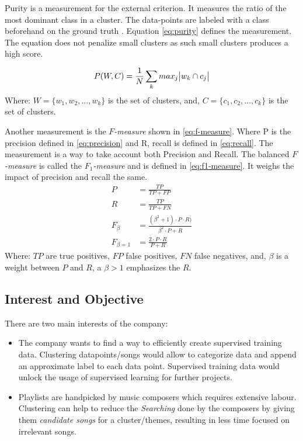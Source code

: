 \documentclass[a4paper,11pt]{article}
\begin{document}
Purity is a measurement for the external criterion. It measures the ratio of the most dominant class in a cluster. The data-points are labeled with a class beforehand on the ground truth \cite{manning2010introduction}. Equation \ref{eq:purity} defines the measurement. The equation does not penalize small clusters as such small clusters produces a high score.

\begin{equation}
  \label{eq:purity}
  P(W, C) = \frac{1}{N}\sum_{k}max_{j}\abs{w_k \cap c_j}
\end{equation}
Where:\newline
$W = \{w_1,w_2,...,w_k\}$ is the set of clusters, and,
$C = \{c_1,c_2,...,c_k\}$ is the set of clusters.

Another measurement is the \textit{$F$-measure} shown in \ref{eq:f-measure}. Where P is the precision defined in \ref{eq:precision} and R, recall is defined in \ref{eq:recall}. The measurement is a way to take account both Precision and Recall. The balanced \textit{$F$-measure} is called the \textit{$F_1$-measure} and is defined in \ref{eq:f1-measure}. It weighs the impact of precision and recall the same.
\begin{align}
  \label{eq:precision}
  P &= \frac{TP}{TP+FP} \\
  \label{eq:recall}
  R &= \frac{TP}{TP+FN} \\
  \label{eq:f-measure}
  F_\beta &= \frac{(\beta^2 + 1) \cdot P \cdot R)}{\beta^2 \cdot P + R} \\
  \label{eq:f1-measure}
  F_{\beta = 1} &= \frac{2 \cdot P \cdot R}{P + R}
\end{align}
Where:\newline
$TP$ are true positives, $FP$ false positives, $FN$ false negatives, and, $\beta$ is a weight between $P$ and $R$, a $\beta > 1$ emphasizes the $R$.

\subsection{Interest and Objective}

There are two main interests of the company:

\begin{itemize}
\item
  The company wants to find a way to efficiently create supervised
  training data. Clustering datapoints/songs would allow to categorize
  data and append an approximate label to each data point. Supervised
  training data would unlock the usage of supervised learning for
  further projects.
\item
  Playlists are handpicked by music composers which requires extensive labour. Clustering can help to
  reduce the \textit{Searching} done by the composers by giving them
  \textit{candidate songs} for a cluster/themes, resulting in less time
  focused on irrelevant songs.
\end{itemize}
\end{document}
